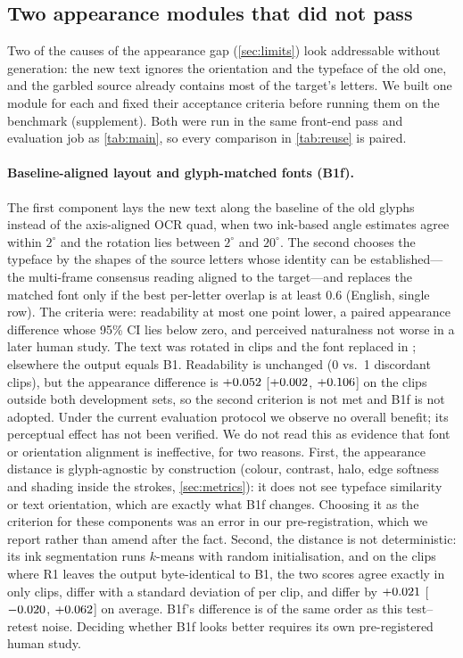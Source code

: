\subsection{Two appearance modules that did not pass}
\label{sec:exp_neg}


Two of the causes of the appearance gap (\cref{sec:limits}) look addressable without generation: the new text ignores the orientation and the typeface of the old one, and the garbled source already contains most of the target's letters. We built one module for each and fixed their acceptance criteria before running them on the benchmark (supplement). Both were run in the same front-end pass and evaluation job as \cref{tab:main}, so every comparison in \cref{tab:reuse} is paired.

\paragraph{Baseline-aligned layout and glyph-matched fonts (B1f).} The first component lays the new text along the baseline of the old glyphs instead of the axis-aligned OCR quad, when two ink-based angle estimates agree within $2^\circ$ and the rotation lies between $2^\circ$ and $20^\circ$. The second chooses the typeface by the shapes of the source letters whose identity can be established---the multi-frame consensus reading aligned to the target---and replaces the matched font only if the best per-letter overlap is at least 0.6 (English, single row). The criteria were: readability at most one point lower, a paired appearance difference whose 95\% CI lies below zero, and perceived naturalness not worse in a later human study. The text was rotated in \rTiltN{} clips and the font replaced in \rFshapeN; elsewhere the output equals B1. Readability is unchanged (0 vs.\ 1 discordant clips), but the appearance difference is $+0.052$ [$+0.002$, $+0.106$] on the clips outside both development sets, so the second criterion is not met and B1f is not adopted. Under the current evaluation protocol we observe no overall benefit; its perceptual effect has not been verified. We do not read this as evidence that font or orientation alignment is ineffective, for two reasons. First, the appearance distance is glyph-agnostic by construction (colour, contrast, halo, edge softness and shading inside the strokes, \cref{sec:metrics}): it does not see typeface similarity or text orientation, which are exactly what B1f changes. Choosing it as the criterion for these components was an error in our pre-registration, which we report rather than amend after the fact. Second, the distance is not deterministic: its ink segmentation runs $k$-means with random initialisation, and on the \rRetestN{} clips where R1 leaves the output byte-identical to B1, the two scores agree exactly in only \rRetestSame{} clips, differ with a standard deviation of \rRetestSD{} per clip, and differ by $+0.021$ [$-0.020$, $+0.062$] on average. B1f's difference is of the same order as this test--retest noise. Deciding whether B1f looks better requires its own pre-registered human study.

